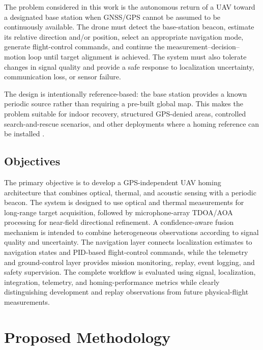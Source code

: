 \documentclass[conference]{IEEEtran}
\begin{document}
The problem considered in this work is the autonomous return of a UAV toward a
designated base station when GNSS/GPS cannot be assumed to be continuously
available. The drone must detect the base-station beacon, estimate its relative
direction and/or position, select an appropriate navigation mode, generate
flight-control commands, and continue the measurement--decision--motion loop
until target alignment is achieved. The system must also tolerate changes in
signal quality and provide a safe response to localization uncertainty,
communication loss, or sensor failure.

The design is intentionally reference-based: the base station provides a known
periodic source rather than requiring a pre-built global map. This makes the
problem suitable for indoor recovery, structured GPS-denied areas, controlled
search-and-rescue scenarios, and other deployments where a homing reference can
be installed
\cite{vanegas2016,achtelik2009,jarraya2025}.

\subsection{Objectives}

The primary objective is to develop a GPS-independent UAV homing architecture
that combines optical, thermal, and acoustic sensing with a periodic beacon.
The system is designed to use optical and thermal measurements for long-range
target acquisition, followed by microphone-array TDOA/AOA processing for
near-field directional refinement. A confidence-aware fusion mechanism is
intended to combine heterogeneous observations according to signal quality and
uncertainty. The navigation layer connects localization estimates to navigation
states and PID-based flight-control commands, while the telemetry and
ground-control layer provides mission monitoring, replay, event logging, and
safety supervision. The complete workflow is evaluated using signal,
localization, integration, telemetry, and homing-performance metrics while
clearly distinguishing development and replay observations from future
physical-flight measurements.


\section{Proposed Methodology}
\end{document}
